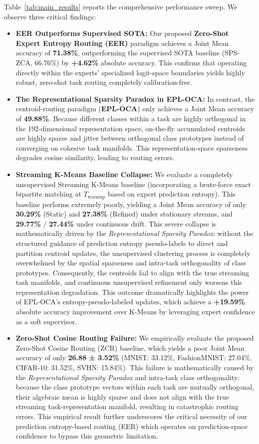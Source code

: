 Table~\ref{tab:main_results} reports the comprehensive performance sweep. We observe three critical findings:
\begin{itemize}
    \item \textbf{EER Outperforms Supervised SOTA:} Our proposed \textbf{Zero-Shot Expert Entropy Routing (EER)} paradigm achieves a Joint Mean accuracy of \textbf{71.38\%}, outperforming the supervised SOTA baseline (SPS-ZCA, 66.76\%) by \textbf{+4.62\%} absolute accuracy. This confirms that operating directly within the experts' specialized logit-space boundaries yields highly robust, zero-shot task routing completely calibration-free.
    \item \textbf{The Representational Sparsity Paradox in EPL-OCA:} In contrast, the centroid-routing paradigm (\textbf{EPL-OCA}) only achieves a Joint Mean accuracy of \textbf{49.88\%}. Because different classes within a task are highly orthogonal in the 192-dimensional representation space, on-the-fly accumulated centroids are highly sparse and jitter between orthogonal class prototypes instead of converging on cohesive task manifolds. This representation-space sparseness degrades cosine similarity, leading to routing errors.
    \item \textbf{Streaming K-Means Baseline Collapse:} We evaluate a completely unsupervised Streaming K-Means baseline (incorporating a brute-force exact bipartite matching at $T_{\text{warmup}}$ based on expert prediction entropy). This baseline performs extremely poorly, yielding a Joint Mean accuracy of only \textbf{30.29\%} (Static) and \textbf{27.38\%} (Refined) under stationary streams, and \textbf{29.77\%} / \textbf{27.44\%} under continuous drift. This severe collapse is mathematically driven by the \emph{Representational Sparsity Paradox}: without the structured guidance of prediction entropy pseudo-labels to direct and partition centroid updates, the unsupervised clustering process is completely overwhelmed by the spatial sparseness and intra-task orthogonality of class prototypes. Consequently, the centroids fail to align with the true streaming task manifolds, and continuous unsupervised refinement only worsens this representation degradation. This outcome dramatically highlights the power of EPL-OCA's entropy-pseudo-labeled updates, which achieve a \textbf{+19.59\%} absolute accuracy improvement over K-Means by leveraging expert confidence as a soft supervisor.
    \item \textbf{Zero-Shot Cosine Routing Failure:} We empirically evaluate the proposed Zero-Shot Cosine Routing (ZCR) baseline, which yields a poor Joint Mean accuracy of only \textbf{26.88 ± 3.52\%} (MNIST: 33.12\%, FashionMNIST: 27.04\%, CIFAR-10: 31.52\%, SVHN: 15.84\%). This failure is mathematically caused by the \emph{Representational Sparsity Paradox} and intra-task class orthogonality: because the class prototype vectors within each task are mutually orthogonal, their algebraic mean is highly sparse and does not align with the true streaming task-representation manifold, resulting in catastrophic routing errors. This empirical result further underscores the critical necessity of our prediction entropy-based routing (EER) which operates on prediction-space confidence to bypass this geometric limitation.

\end{itemize}
